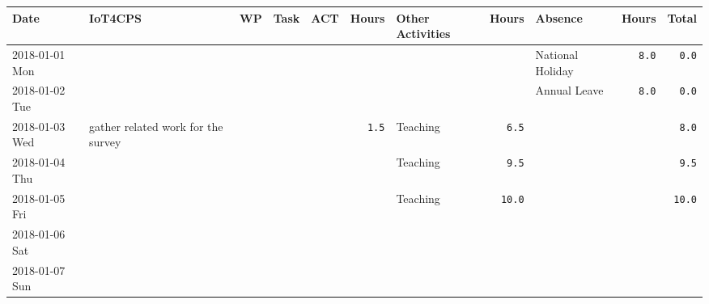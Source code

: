 \documentclass[10pt,a4paper,landscape]{article}
\def\tuwBlue{tuwBlue}
\begin{document}
\vspace{5mm}
{\small

    \begin{tabular}{|l||p{65mm}|c|c|c|r||p{30mm}|r||p{30mm}|r||r|}
    \hline
    \textbf{{Date}} & \textbf{{IoT4CPS}} & \textbf{{WP}} & \textbf{{Task}} & \textbf{{ACT}} & \textbf{{Hours}} & \textbf{{Other Activities}} & \textbf{{Hours}} & \textbf{{Absence}} & \textbf{{Hours}} & \textbf{{Total}} \\ \hline \hline
    
    \rowcolor{\tuwBlue!5!white}
    2018-01-01 Mon &  &  &  &  & \cellcolor{\tuwBlue!20!white}  &  & \cellcolor{\tuwBlue!20!white}  & National Holiday & \cellcolor{\tuwBlue!20!white} \texttt{8.0} & \cellcolor{red!30!white} \texttt{0.0}
      \\ \hline
    
    \rowcolor{\tuwBlue!5!white}
    2018-01-02 Tue &  &  &  &  & \cellcolor{\tuwBlue!20!white}  &  & \cellcolor{\tuwBlue!20!white}  & Annual Leave & \cellcolor{\tuwBlue!20!white} \texttt{8.0} & \cellcolor{red!30!white} \texttt{0.0}
      \\ \hline
    
    \rowcolor{\tuwBlue!5!white}
    2018-01-03 Wed & gather related work for the survey &  &  &  & \cellcolor{\tuwBlue!20!white} \texttt{1.5} & Teaching & \cellcolor{\tuwBlue!20!white} \texttt{6.5} &  & \cellcolor{\tuwBlue!20!white}  & \cellcolor{\tuwBlue!40!white} \texttt{8.0}
      \\ \hline
    
    \rowcolor{\tuwBlue!5!white}
    2018-01-04 Thu &  &  &  &  & \cellcolor{\tuwBlue!20!white}  & Teaching & \cellcolor{\tuwBlue!20!white} \texttt{9.5} &  & \cellcolor{\tuwBlue!20!white}  & \cellcolor{\tuwBlue!40!white} \texttt{9.5}
      \\ \hline
    
    \rowcolor{\tuwBlue!5!white}
    2018-01-05 Fri &  &  &  &  & \cellcolor{\tuwBlue!20!white}  & Teaching & \cellcolor{\tuwBlue!20!white} \texttt{10.0} &  & \cellcolor{\tuwBlue!20!white}  & \cellcolor{\tuwBlue!40!white} \texttt{10.0}
      \\ \hline
    
    \rowcolor{lightgray}
    2018-01-06 Sat &  &  &  &  &  &  &  &  &  & 
      \\ \hline
    
    \rowcolor{lightgray}
    2018-01-07 Sun &  &  &  &  &  &  &  &  &  & 
      \\ \hline
    

\end{tabular}}
\end{document}
